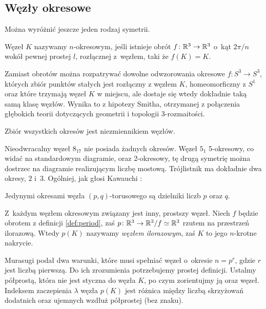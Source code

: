 
\subsection{Węzły okresowe}
%
Można wyróżnić jeszcze jeden rodzaj symetrii.

\begin{definition}
\label{def:period}%
    Węzeł $K$ nazywamy $n$-okresowym, jeśli istnieje obrót $f \colon \mathbb R^3 \to \mathbb R^3$ o~kąt $2\pi/n$ wokół pewnej prostej $l$, rozłącznej z~węzłem, taki że $f(K) = K$.
\end{definition}

Zamiast obrotów można rozpatrywać dowolne odwzorowania okresowe $f \colon S^3 \to S^3$, których zbiór punktów stałych jest rozłączny z węzłem $K$, homeomorficzny z $S^1$ oraz które trzymają węzeł $K$ w miejscu, ale dostaje się wtedy dokładnie taką samą klasę węzłów.
Wynika to z hipotezy Smitha, otrzymanej z połączenia głębokich teorii dotyczących geometrii i topologii 3-rozmaitości.

\begin{proposition}
    Zbiór wszystkich okresów jest niezmiennikiem węzłów.
\end{proposition}

Nieodwracalny węzeł $8_{17}$ nie posiada żadnych okresów.
Węzeł $5_1$ 5-okresowy, co widać na standardowym diagramie, oraz 2-okresowy, tę drugą symetrię można dostrzec na diagramie realizującym liczbę mostową.
Trójlistnik ma dokładnie dwa okresy, $2$ i~$3$.
Ogólniej, jak głosi Kawauchi \cite[ćwiczenie 10.1.9]{kawauchi96}:

\begin{proposition}
    Jedynymi okresami węzła $(p, q)$-torusowego są dzielniki liczb $p$ oraz $q$.
\end{proposition}

Z~każdym węzłem okresowym związany jest inny, prostszy węzeł.
Niech $f$ będzie obrotem z definicji \ref{def:period}, zaś $p \colon \mathbb R^3 \to \mathbb R^3/f \simeq \mathbb R^3$ rzutem na przestrzeń ilorazową.
%
Wtedy $p(K)$ nazywamy \emph{węzłem ilorazowym}, zaś $K$ to jego $n$-krotne nakrycie.

Murasugi podał dwa warunki, które musi spełniać węzeł o~okresie $n = p^r$, gdzie $r$ jest liczbą pierwszą.
Do ich zrozumienia potrzebujemy prostej definicji.
Ustalmy półprostą, która nie jest styczna do węzła $K$, po czym zorientujmy ją oraz węzeł.
Indeksem zaczepienia $\lambda$ węzła $p(K)$ jest różnica między liczbą skrzyżowań dodatnich oraz ujemnych wzdłuż półprostej (bez znaku).

